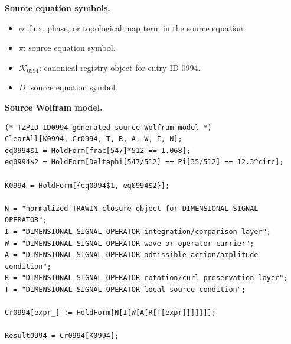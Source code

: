\begin{minipage}[t]{0.49\linewidth}
\begingroup
\small
\raggedright
\textbf{Source equation symbols.}\par
\begin{itemize}[leftmargin=1.35em,itemsep=1pt,topsep=1pt,parsep=0pt]
    \item $\phi$: flux, phase, or topological map term in the source equation.
    \item $\pi$: source equation symbol.
    \item $\mathcal{K}_{0994}$: canonical registry object for entry ID 0994.
    \item $D$: source equation symbol.
\end{itemize}
\endgroup
\end{minipage}\hfill
\begin{minipage}[t]{0.47\linewidth}
\begingroup
\scriptsize
\raggedright
\textbf{Source Wolfram model.}\par
\begin{Verbatim}[fontsize=\tiny,breaklines=true,breakanywhere=true]
(* TZPID ID0994 generated source Wolfram model *)
ClearAll[K0994, Cr0994, T, R, A, W, I, N];
eq0994$1 = HoldForm[frac[547]*512 == 1.068];
eq0994$2 = HoldForm[Deltaphi[547/512] == Pi[35/512] == 12.3^circ];

K0994 = HoldForm[{eq0994$1, eq0994$2}];

N = "normalized TRAWIN closure object for DIMENSIONAL SIGNAL OPERATOR";
I = "DIMENSIONAL SIGNAL OPERATOR integration/comparison layer";
W = "DIMENSIONAL SIGNAL OPERATOR wave or operator carrier";
A = "DIMENSIONAL SIGNAL OPERATOR admissible action/amplitude condition";
R = "DIMENSIONAL SIGNAL OPERATOR rotation/curl preservation layer";
T = "DIMENSIONAL SIGNAL OPERATOR local source condition";

Cr0994[expr_] := HoldForm[N[I[W[A[R[T[expr]]]]]]];

Result0994 = Cr0994[K0994];
\end{Verbatim}
\endgroup
\end{minipage}

